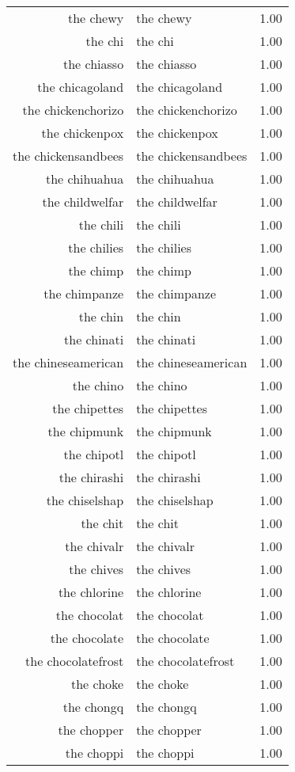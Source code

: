\begin{table}[ht]
\begin{tabular}{rlr}
  the chewy & the chewy & 1.00 \\ 
  the chi & the chi & 1.00 \\ 
  the chiasso & the chiasso & 1.00 \\ 
  the chicagoland & the chicagoland & 1.00 \\ 
  the chickenchorizo & the chickenchorizo & 1.00 \\ 
  the chickenpox & the chickenpox & 1.00 \\ 
  the chickensandbees & the chickensandbees & 1.00 \\ 
  the chihuahua & the chihuahua & 1.00 \\ 
  the childwelfar & the childwelfar & 1.00 \\ 
  the chili & the chili & 1.00 \\ 
  the chilies & the chilies & 1.00 \\ 
  the chimp & the chimp & 1.00 \\ 
  the chimpanze & the chimpanze & 1.00 \\ 
  the chin & the chin & 1.00 \\ 
  the chinati & the chinati & 1.00 \\ 
  the chineseamerican & the chineseamerican & 1.00 \\ 
  the chino & the chino & 1.00 \\ 
  the chipettes & the chipettes & 1.00 \\ 
  the chipmunk & the chipmunk & 1.00 \\ 
  the chipotl & the chipotl & 1.00 \\ 
  the chirashi & the chirashi & 1.00 \\ 
  the chiselshap & the chiselshap & 1.00 \\ 
  the chit & the chit & 1.00 \\ 
  the chivalr & the chivalr & 1.00 \\ 
  the chives & the chives & 1.00 \\ 
  the chlorine & the chlorine & 1.00 \\ 
  the chocolat & the chocolat & 1.00 \\ 
  the chocolate & the chocolate & 1.00 \\ 
  the chocolatefrost & the chocolatefrost & 1.00 \\ 
  the choke & the choke & 1.00 \\ 
  the chongq & the chongq & 1.00 \\ 
  the chopper & the chopper & 1.00 \\ 
  the choppi & the choppi & 1.00 \\ 

\end{tabular}
\end{table}
